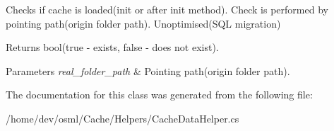 Checks if cache is loaded(init or after init method). Check is performed by pointing path(origin folder path). Unoptimised(\+S\+Q\+L migration) 

\begin{DoxyReturn}{Returns}
bool(true -\/ exists, false -\/ does not exist). 
\end{DoxyReturn}

\begin{DoxyParams}{Parameters}
{\em real\+\_\+folder\+\_\+path} & Pointing path(origin folder path).\\
\hline
\end{DoxyParams}


The documentation for this class was generated from the following file\+:\begin{DoxyCompactItemize}
\item 
/home/dev/osml/\+Cache/\+Helpers/Cache\+Data\+Helper.\+cs\end{DoxyCompactItemize}
